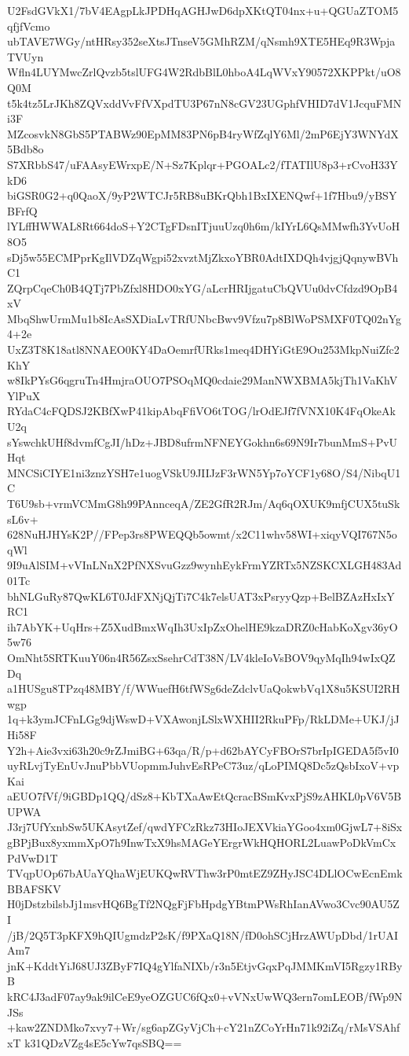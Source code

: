 U2FsdGVkX1/7bV4EAgpLkJPDHqAGHJwD6dpXKtQT04nx+u+QGUaZTOM5qfjfVcmo
ubTAVE7WGy/ntHRsy352seXtsJTnseV5GMhRZM/qNsmh9XTE5HEq9R3WpjaTVUyn
Wfln4LUYMwcZrlQvzb5tslUFG4W2RdbBlL0hboA4LqWVxY90572XKPPkt/uO8Q0M
t5k4tz5LrJKh8ZQVxddVvFfVXpdTU3P67nN8cGV23UGphfVHID7dV1JcquFMNi3F
MZcosvkN8GbS5PTABWz90EpMM83PN6pB4ryWfZqlY6Ml/2mP6EjY3WNYdX5Bdb8o
S7XRbbS47/uFAAsyEWrxpE/N+Sz7Kplqr+PGOALc2/fTATIlU8p3+rCvoH33YkD6
biGSR0G2+q0QaoX/9yP2WTCJr5RB8uBKrQbh1BxIXENQwf+1f7Hbu9/yBSYBFrfQ
lYLffHWWAL8Rt664doS+Y2CTgFDsnITjuuUzq0h6m/kIYrL6QsMMwfh3YvUoH8O5
sDj5w55ECMPprKgIlVDZqWgpi52xvztMjZkxoYBR0AdtIXDQh4vjgjQqnywBVhC1
ZQrpCqeCh0B4QTj7PbZfxl8HDO0xYG/aLcrHRIjgatuCbQVUu0dvCfdzd9OpB4xV
MbqShwUrmMu1b8IcAsSXDiaLvTRfUNbcBwv9Vfzu7p8BlWoPSMXF0TQ02nYg4+2e
UxZ3T8K18atl8NNAEO0KY4DaOemrfURks1meq4DHYiGtE9Ou253MkpNuiZfc2KhY
w8IkPYsG6qgruTn4HmjraOUO7PSOqMQ0cdaie29ManNWXBMA5kjTh1VaKhVYlPuX
RYdaC4cFQDSJ2KBfXwP41kipAbqFfiVO6tTOG/lrOdEJf7fVNX10K4FqOkeAkU2q
sYswchkUHf8dvmfCgJI/hDz+JBD8ufrmNFNEYGokhn6s69N9Ir7bunMmS+PvUHqt
MNCSiCIYE1ni3znzYSH7e1uogVSkU9JIIJzF3rWN5Yp7oYCF1y68O/S4/NibqU1C
T6U9sb+vrmVCMmG8h99PAnnceqA/ZE2GfR2RJm/Aq6qOXUK9mfjCUX5tuSksL6v+
628NuHJHYsK2P//FPep3rs8PWEQQb5owmt/x2C11whv58WI+xiqyVQI767N5oqWl
9I9uAlSIM+vVInLNnX2PfNXSvuGzz9wynhEykFrmYZRTx5NZSKCXLGH483Ad01Tc
bhNLGuRy87QwKL6T0JdFXNjQjTi7C4k7elsUAT3xPsryyQzp+BelBZAzHxIxYRC1
ih7AbYK+UqHrs+Z5XudBmxWqIh3UxIpZxOhelHE9kzaDRZ0cHabKoXgv36yO5w76
OmNht5SRTKuuY06n4R56ZsxSsehrCdT38N/LV4kleIoVsBOV9qyMqIh94wIxQZDq
a1HUSgu8TPzq48MBY/f/WWuefH6tfWSg6deZdclvUaQokwbVq1X8u5KSUI2RHwgp
1q+k3ymJCFnLGg9djWswD+VXAwonjLSlxWXHII2RkuPFp/RkLDMe+UKJ/jJHi58F
Y2h+Aie3vxi63h20c9rZJmiBG+63qa/R/p+d62bAYCyFBOrS7brIpIGEDA5f5vI0
uyRLvjTyEnUvJnuPbbVUopmmJuhvEsRPeC73uz/qLoPIMQ8Dc5zQsbIxoV+vpKai
aEUO7fVf/9iGBDp1QQ/dSz8+KbTXaAwEtQcracBSmKvxPjS9zAHKL0pV6V5BUPWA
J3rj7UfYxnbSw5UKAsytZef/qwdYFCzRkz73HIoJEXVkiaYGoo4xm0GjwL7+8iSx
gBPjBux8yxmmXpO7h9InwTxX9hsMAGeYErgrWkHQHORL2LuawPoDkVmCxPdVwD1T
TVqpUOp67bAUaYQhaWjEUKQwRVThw3rP0mtEZ9ZHyJSC4DLlOCwEcnEmkBBAFSKV
H0jDstzbilsbJj1msvHQ6BgTf2NQgFjFbHpdgYBtmPWsRhIanAVwo3Cvc90AU5ZI
/jB/2Q5T3pKFX9hQIUgmdzP2sK/f9PXaQ18N/fD0ohSCjHrzAWUpDbd/1rUAIAm7
jnK+KddtYiJ68UJ3ZByF7IQ4gYlfaNIXb/r3n5EtjvGqxPqJMMKmVI5Rgzy1RByB
kRC4J3adF07ay9ak9ilCeE9yeOZGUC6fQx0+vVNxUwWQ3ern7omLEOB/fWp9NJSs
+kaw2ZNDMko7xvy7+Wr/sg6apZGyVjCh+cY21nZCoYrHn71k92iZq/rMsVSAhfxT
k31QDzVZg4sE5cYw7qsSBQ==
